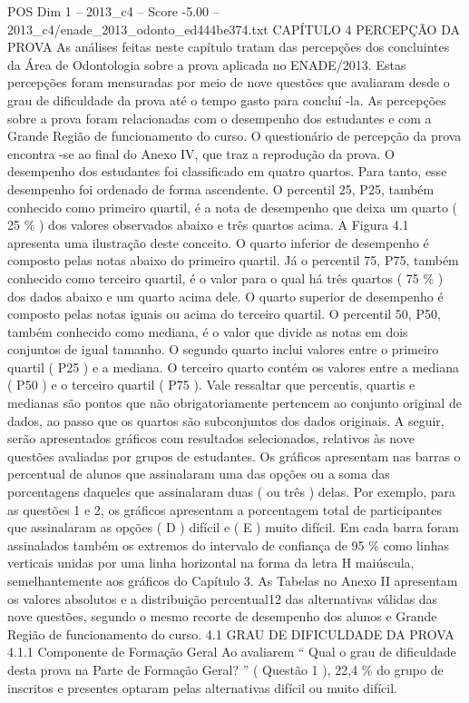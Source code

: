 \begin{textsample}{POS Dim 1 – 2013\_c4 – Score -5.00 – 2013\_c4/enade\_2013\_odonto\_ed444be374.txt}  \label{ex:f1_pos_386}
CAPÍTULO 4 PERCEPÇÃO DA PROVA As análises feitas neste capítulo tratam das percepções dos concluintes da Área de Odontologia sobre a prova aplicada no ENADE/2013.
Estas percepções foram mensuradas por meio de nove questões que avaliaram desde o grau de dificuldade da prova até o tempo gasto para concluí -la.
As percepções sobre a prova foram relacionadas com o desempenho dos estudantes e com a Grande Região de funcionamento do curso.
O questionário de percepção da prova encontra -se ao final do Anexo IV, que traz a reprodução da prova.
O desempenho dos estudantes foi classificado em quatro quartos.
Para tanto, esse desempenho foi ordenado de forma ascendente.
O percentil 25, P25, também conhecido como primeiro quartil, é a nota de desempenho que deixa um quarto ( 25 \% ) dos valores observados abaixo e três quartos acima.
A Figura 4.1 apresenta uma ilustração deste conceito.
O quarto inferior de desempenho é composto pelas notas abaixo do primeiro quartil.
Já o percentil 75, P75, também conhecido como terceiro quartil, é o valor para o qual há três quartos ( 75 \% ) dos dados abaixo e um quarto acima dele.
O quarto superior de desempenho é composto pelas notas iguais ou acima do terceiro quartil.
O percentil 50, P50, também conhecido como mediana, é o valor que divide as notas em dois conjuntos de igual tamanho.
O segundo quarto inclui valores entre o primeiro quartil ( P25 ) e a mediana.
O terceiro quarto contém os valores entre a mediana ( P50 ) e o terceiro quartil ( P75 ).
Vale ressaltar que percentis, quartis e medianas são pontos que não obrigatoriamente pertencem ao conjunto original de dados, ao passo que os quartos são subconjuntos dos dados originais.
A seguir, serão apresentados gráficos com resultados selecionados, relativos às nove questões avaliadas por grupos de estudantes.
Os gráficos apresentam nas barras o percentual de alunos que assinalaram uma das opções ou a soma das porcentagens daqueles que assinalaram duas ( ou três ) delas.
Por exemplo, para as questões 1 e 2, os gráficos apresentam a porcentagem total de participantes que assinalaram as opções ( D ) difícil e ( E ) muito difícil.
Em cada barra foram assinalados também os extremos do intervalo de confiança de 95 \% como linhas verticais unidas por uma linha horizontal na forma da letra H maiúscula, semelhantemente aos gráficos do Capítulo 3.
As Tabelas no Anexo II apresentam os valores absolutos e a distribuição percentual12 das alternativas válidas das nove questões, segundo o mesmo recorte de desempenho dos alunos e Grande Região de funcionamento do curso. 4.1 GRAU DE DIFICULDADE DA PROVA 4.1.1 Componente de Formação Geral Ao avaliarem “ Qual o grau de dificuldade desta prova na Parte de Formação Geral? ” ( Questão 1 ), 22,4 \% do grupo de inscritos e presentes optaram pelas alternativas difícil ou muito difícil.

\end{textsample}

